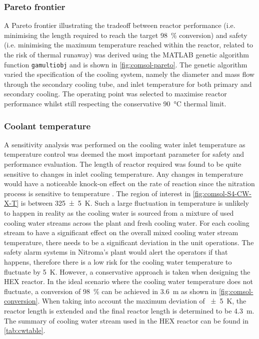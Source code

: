 \subsubsection{Pareto frontier}
A Pareto frontier illustrating the tradeoff between reactor performance (i.e. minimising the length required to reach the target \SI{98}{\percent} conversion) and safety (i.e. minimising the maximum temperature reached within the reactor, related to the risk of thermal runaway) was derived using the MATLAB genetic algorithm function \texttt{gamultiobj} and is shown in \cref{fig:comsol-pareto}. The genetic algorithm varied the specification of the cooling system, namely the diameter and mass flow through the secondary cooling tube, and inlet temperature for both primary and secondary cooling. The operating point was selected to maximise reactor performance whilst still respecting the conservative \SI{90}{\celsius} thermal limit.

\subsubsection{Coolant temperature}
\label{sec:coolanttemp}
A sensitivity analysis was performed on the cooling water inlet temperature as temperature control was deemed the most important parameter for safety and performance evaluation. The length of reactor required was found to be quite sensitive to changes in inlet cooling temperature. Any changes in temperature would have a noticeable knock-on effect on the rate of reaction since the nitration process is sensitive to temperature \cite{chen_experimental_1998}. The region of interest in \cref{fig:comsol-S4-CW-X-T} is between \SI{325+-5}{\K}. Such a large fluctuation in temperature is unlikely to happen in reality as the cooling water is sourced from a mixture of used cooling water streams across the plant and fresh cooling water. For each cooling stream to have a significant effect on the overall mixed cooling water stream temperature, there needs to be a significant deviation in the unit operations. The safety alarm systems in Nitroma's plant would alert the operators if that happens, therefore there is a low risk for the cooling water temperature to fluctuate by \pm \SI{5}{\K}. However, a conservative approach is taken when designing the HEX reactor. In the ideal scenario where the cooling water temperature does not fluctuate, a conversion of \SI{98}{\percent} can be achieved in \SI{3.6}{\m} as shown in \cref{fig:comsol-conversion}. When taking into account the maximum deviation of \SI{+-5}{\K}, the reactor length is extended and the final reactor length is determined to be \SI{4.3}{\metre}. The summary of cooling water stream used in the HEX reactor can be found in \cref{tab:cwtable}.

